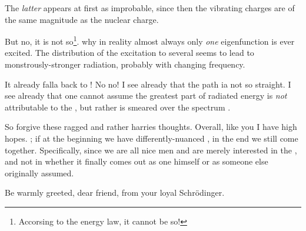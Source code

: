 The \textit{latter} appears at first as improbable, since then the vibrating charges are of the same magnitude as the nuclear charge. 

But no, it is not so\footnote{Accorsing to the energy law, it cannot be so!}.  why in reality almost always only \textit{one} eigenfunction is ever excited. The distribution of the excitation to several seems to lead to monstrously-stronger radiation, probably with changing frequency.

It already falla back to ! No no! I see already that the path ia not so straight. I see already that one cannot assume the greatest part of radiated energy is \textit{not} attributable to the , but rather is smeared over the spectrum .

So forgive these ragged and rather harries thoughts. Overall, like you I have high hopes. ; if at the beginning we have differently-nuanced , in the end we still come together. Specifically, since we are all nice men and are merely interested in the , and not in whether it finally comes out as one himself or as someone else originally assumed. 

Be warmly greeted, dear friend, from your loyal Schr\"odinger.